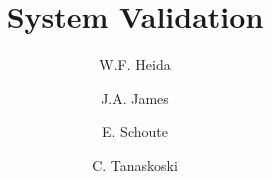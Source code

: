 \documentclass[oneside]{tudelft-report}
\begin{document}
\frontmatter

\title[IN4387 Project: Group 6]{System Validation}
\author{W.F. Heida \and J.A. James \and E. Schoute \and  C. Tanaskoski}

\makecover

%

\tableofcontents


\mainmatter








 




\end{document}
